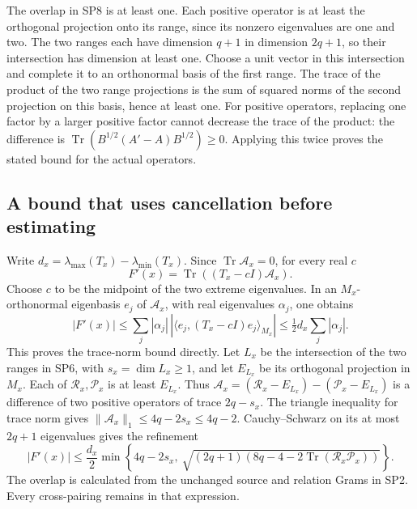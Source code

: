 The overlap in SP8 is at least one. Each positive operator is at
least the orthogonal projection onto its range, since its nonzero
eigenvalues are one and two. The two ranges each have dimension
\(q+1\) in dimension \(2q+1\), so their intersection has dimension at
least one. Choose a unit vector in this intersection and complete
it to an orthonormal basis of the first range. The trace of the
product of the two range projections is the sum of squared norms
of the second projection on this basis, hence at least one.
For positive operators, replacing one factor by a larger positive
factor cannot decrease the trace of the product: the difference
is \(\operatorname{Tr}(B^{1/2}(A'-A)B^{1/2})\geq0\).
Applying this twice proves the stated bound for the actual operators.

\subsection{A bound that uses cancellation before estimating}
Write
\(d_x=\lambda_{\max}(T_x)-\lambda_{\min}(T_x)\).
Since \(\operatorname{Tr}\mathcal A_x=0\), for every real \(c\)
\[
       F'(x)=\operatorname{Tr}((T_x-cI)\mathcal A_x).
 \tag{SP9}
\]
Choose \(c\) to be the midpoint of the two extreme eigenvalues.
In an \(M_x\)-orthonormal eigenbasis \(e_j\) of \(\mathcal A_x\),
with real eigenvalues \(\alpha_j\), one obtains
\[
 |F'(x)|
 \leq\sum_j|\alpha_j|\,
       |\langle e_j,(T_x-cI)e_j\rangle_{M_x}|
 \leq\tfrac12d_x\sum_j|\alpha_j|.
\]
This proves the trace-norm bound directly. Let \(L_x\) be the
intersection of the two ranges in SP6, with \(s_x=\dim L_x\geq1\),
and let \(E_{L_x}\) be its orthogonal projection in \(M_x\).
Each of \(\mathcal R_x,\mathcal P_x\) is at least \(E_{L_x}\).
Thus
\(\mathcal A_x=(\mathcal R_x-E_{L_x})-(\mathcal P_x-E_{L_x})\)
is a difference of two positive operators of trace \(2q-s_x\).
The triangle inequality for trace norm gives
\(\|\mathcal A_x\|_1\leq4q-2s_x\leq4q-2\).
Cauchy--Schwarz on its at most \(2q+1\) eigenvalues gives the refinement
\[
 \boxed{
 |F'(x)|\leq\frac{d_x}{2}
 \min\left\{4q-2s_x,\
 \sqrt{(2q+1)
     (8q-4-2\operatorname{Tr}(\mathcal R_x\mathcal P_x))}
     \right\}.}
 \tag{SP10}
\]
The overlap is calculated from the unchanged source and relation
Grams in SP2. Every cross-pairing remains in that expression.

